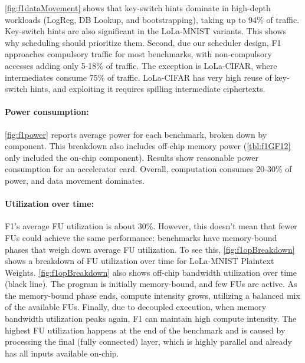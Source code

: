 \autoref{fig:f1dataMovement} shows that key-switch hints dominate in high-depth workloads
(LogReg, DB Lookup, and bootstrapping), taking up to 94\% of traffic.
Key-switch hints are also significant in the LoLa-MNIST variants.
This shows why scheduling should prioritize them.
Second, due our scheduler design, F1 approaches compulsory
traffic for most benchmarks, with non\hyp{}compulsory accesses
adding only 5-18\% of traffic.
The exception is LoLa-CIFAR, where intermediates consume 75\% of traffic.
LoLa-CIFAR has very high reuse of key-switch hints,
and exploiting it requires spilling intermediate ciphertexts.

\figFOneDataMovement
\figFOneOpBreakdown

\paragraph{Power consumption:}
\autoref{fig:f1power} reports average power for each benchmark, broken down by component.
This breakdown also includes off-chip memory power (\autoref{tbl:f1GF12} only included the on-chip component).
Results show reasonable power consumption for an accelerator card.
Overall, computation consumes 20-30\% of power, and data movement dominates.

\paragraph{Utilization over time:}
F1's average FU utilization is about 30\%.
However, this doesn't mean that fewer FUs could achieve the same performance:
benchmarks have memory\hyp{}bound phases 
that weigh down average FU utilization.
To see this, \autoref{fig:f1opBreakdown} shows a breakdown of FU utilization over 
time for LoLa-MNIST Plaintext Weights.
\autoref{fig:f1opBreakdown} also shows off-chip bandwidth utilization over time (black line).
The program is initially memory-bound, and few FUs are active.
As the memory-bound phase ends, compute intensity grows, 
utilizing a balanced mix of the available FUs.
Finally, due to decoupled execution,
when memory bandwidth utilization peaks again,
F1 can maintain high compute intensity.
The highest FU utilization happens at the end of the benchmark and is caused by processing
the final (fully connected) layer, which is highly parallel and already has all inputs available on-chip.



